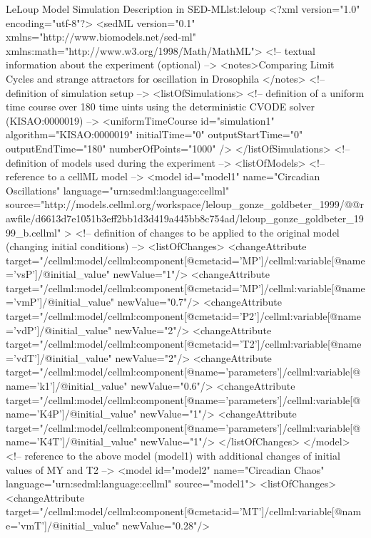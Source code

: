 \footnotesize
\begin{myXmlLst}{LeLoup Model Simulation Description in SED-ML}{lst:leloup}
<?xml version="1.0" encoding="utf-8"?>
<sedML version="0.1" xmlns="http://www.biomodels.net/sed-ml" xmlns:math="http://www.w3.org/1998/Math/MathML">
 <!-- textual information about the experiment (optional) -->
 <notes>Comparing Limit Cycles and strange attractors for oscillation in Drosophila
 </notes> 
 <!-- definition of simulation setup -->
 <listOfSimulations>
  <!-- definition of a uniform time course over 180 time uints using the deterministic CVODE solver (KISAO:0000019) -->
  <uniformTimeCourse id="simulation1" algorithm="KISAO:0000019" initialTime="0" outputStartTime="0" outputEndTime="180" numberOfPoints="1000" />
 </listOfSimulations>
 <!-- definition of models used during the experiment -->
 <listOfModels>
  <!-- reference to a cellML model -->
  <model id="model1" name="Circadian Oscillations" language="urn:sedml:language:cellml" 
   source="http://models.cellml.org/workspace/leloup_gonze_goldbeter_1999/@@rawfile/d6613d7e1051b3eff2bb1d3d419a445bb8c754ad/leloup_gonze_goldbeter_1999_b.cellml" >
   <!-- definition of changes to be applied to the original model (changing initial conditions) -->
   <listOfChanges>
    <changeAttribute target="/cellml:model/cellml:component[@cmeta:id='MP']/cellml:variable[@name='vsP']/@initial_value" newValue="1"/>
    <changeAttribute target="/cellml:model/cellml:component[@cmeta:id='MP']/cellml:variable[@name='vmP']/@initial_value" newValue="0.7"/>
    <changeAttribute target="/cellml:model/cellml:component[@cmeta:id='P2']/cellml:variable[@name='vdP']/@initial_value" newValue="2"/>
    <changeAttribute target="/cellml:model/cellml:component[@cmeta:id='T2']/cellml:variable[@name='vdT']/@initial_value" newValue="2"/>  
    <changeAttribute target="/cellml:model/cellml:component[@name='parameters']/cellml:variable[@name='k1']/@initial_value" newValue="0.6"/>
    <changeAttribute target="/cellml:model/cellml:component[@name='parameters']/cellml:variable[@name='K4P']/@initial_value" newValue="1"/>
    <changeAttribute target="/cellml:model/cellml:component[@name='parameters']/cellml:variable[@name='K4T']/@initial_value" newValue="1"/>
   </listOfChanges>
  </model>
  <!-- reference to the above model (model1) with additional changes of initial values of MY and T2 -->
  <model id="model2" name="Circadian Chaos" language="urn:sedml:language:cellml" source="model1">
   <listOfChanges>
    <changeAttribute target="/cellml:model/cellml:component[@cmeta:id='MT']/cellml:variable[@name='vmT']/@initial_value" newValue="0.28"/>

\end{myXmlLst}
